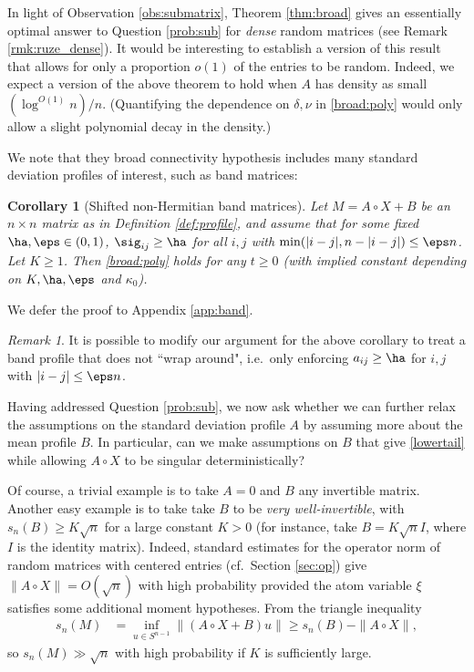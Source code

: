 \documentclass[aop,preprint]{imsart}
\theoremstyle{plain}
\newtheorem{corollary}[theorem]{Corollary}
\theoremstyle{definition}
\theoremstyle{remark}
\newtheorem{remark}[theorem]{Remark}
\numberwithin{equation}{section}
\numberwithin{theorem}{section}
\begin{document}
In light of Observation \ref{obs:submatrix}, Theorem \ref{thm:broad} gives an essentially optimal answer to Question \ref{prob:sub} for \emph{dense} random matrices (see Remark \ref{rmk:ruze_dense}). 
It would be interesting to establish a version of this result that allows for only a proportion $o(1)$ of the entries to be random.
Indeed, we expect a version of the above theorem to hold when $A$ has density as small $(\log^{O(1)}n)/n$. (Quantifying the dependence on $\delta,\nu$ in \eqref{broad:poly} would only allow a slight polynomial decay in the density.)

We note that they broad connectivity hypothesis includes many standard deviation profiles of interest, such as band matrices:

\begin{corollary}[Shifted non-Hermitian band matrices]	\label{cor:band}
Let $M=A\circ X+ B$ be an $n\times n$ matrix as in Definition \ref{def:profile}, and assume that for some fixed $\ha,\eps\in (0,1)$, $\sig_{ij} \ge \ha$ for all $i,j$ with $\min(|i-j|,n-|i-j|)\le \eps n$. 
Let $K\ge 1$.
Then \eqref{broad:poly} holds for any $t\ge 0$ (with implied constant depending on $K,\ha,\eps$ and $\kappa_0$).
\end{corollary}

We defer the proof to Appendix \ref{app:band}.



\begin{remark}
It is possible to modify our argument for the above corollary to treat a band profile that does not ``wrap around", i.e.\ only enforcing $a_{ij}\ge \ha$ for $i,j$ with $|i-j|\le \eps n$. 
\end{remark}


%

Having addressed Question \ref{prob:sub}, we now ask whether we can further relax the assumptions on the standard deviation profile $A$ by assuming more about the mean profile $B$. 
In particular, can we make assumptions on $B$ that give \eqref{lowertail} while allowing $A\circ X$ to be singular deterministically?

Of course, a trivial example is to take $A=0$ and $B$ any invertible matrix.
Another easy example is to take take $B$ to be \emph{very well-invertible}, with $s_n(B) \ge K\sqrt{n}$ for a large constant $K>0$ (for instance, take $B=K\sqrt{n}I$, where $I$ is the identity matrix).
Indeed, standard estimates for the operator norm of random matrices with centered entries (cf.\ Section \ref{sec:op}) give $\|A\circ X\| = O(\sqrt{n})$ with high probability provided the atom variable $\xi$ satisfies some additional moment hypotheses. 
From the triangle inequality
\begin{align*}
s_n(M)  &= \inf_{u\in S^{n-1}} \|(A\circ X+B)u\| \ge  s_n(B) - \|A\circ X\|,
\end{align*}
so $s_n(M)\gg \sqrt{n}$ with high probability if $K$ is sufficiently large.
\end{document}
